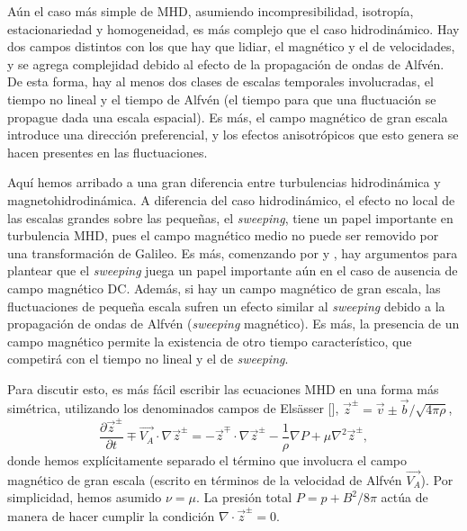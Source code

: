 Aún el caso más simple de MHD, asumiendo incompresibilidad, isotropía,
estacionariedad y homogeneidad, es más complejo que el caso
hidrodinámico. Hay dos campos distintos con los que hay que lidiar, el
magnético y el de velocidades, y se agrega complejidad debido al
efecto de la propagación de ondas de Alfv\'en. De esta forma, hay al
menos dos clases de escalas temporales involucradas, el tiempo no
lineal y el tiempo de Alfv\'en (el tiempo para que una fluctuación se
propague dada una escala espacial). Es más, el campo magnético de gran
escala introduce una dirección preferencial, y los efectos
anisotrópicos que esto genera se hacen presentes en las fluctuaciones.

Aquí hemos arribado a una gran diferencia entre turbulencias
hidrodinámica y magnetohidrodinámica. A diferencia del caso
hidrodinámico, el efecto no local de las escalas grandes sobre las
pequeñas, el \textit{sweeping}, tiene un papel importante en
turbulencia MHD, pues el campo magnético medio no puede ser
removido por una transformación de Galileo. Es más, comenzando por
\cite{iroshnikov_turbulence_1964} y
\cite{kraichnan_inertial-range_1965}, hay argumentos para plantear que
el \textit{sweeping} juega un papel importante aún en el caso de
ausencia de campo magnético DC. Además, si hay un campo magnético de
gran escala, las fluctuaciones de pequeña escala sufren un efecto
similar al \textit{sweeping} debido a la propagación de ondas de
Alfv\'en (\textit{sweeping} magnético). Es más, la presencia de un
campo magnético permite la existencia de otro tiempo característico,
que competirá con el tiempo no lineal y el de \textit{sweeping}.

Para discutir esto, es más fácil escribir las ecuaciones MHD
en una forma más simétrica, utilizando los denominados campos de
Els\"asser [\cite{elsasser_hydromagnetism_1956}], $\vec{z}^\pm =
\vec{v} \pm \vec{b}/\sqrt{4\pi\rho}$,
\begin{equation}\label{eq2:MHDElsasser}
  \frac{\partial \vec{z}^\pm}{\partial t} \mp \vec{V_A} \cdot \nabla\vec{z}^\pm = -\vec{z}^\mp \cdot \nabla\vec{z}^\pm - \frac{1}{\rho} \nabla P + \mu \nabla^2 \vec{z}^\pm,
\end{equation}
donde hemos explícitamente separado el término que involucra el campo
magnético de gran escala (escrito en términos de la velocidad de
Alfv\'en $\vec{V_A}$). Por simplicidad, hemos asumido $\nu = \mu$. La
presión total $P = p + B^2/8\pi$ actúa de manera de hacer cumplir la
condición $\nabla\cdot\vec{z}^\pm = 0$.

